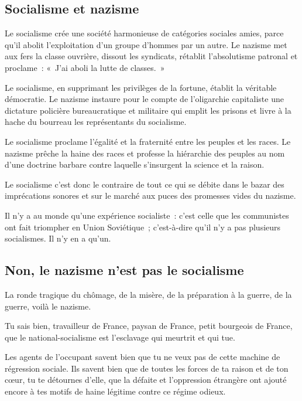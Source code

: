 \documentclass[french,twoside]{book} %
\begin{document}
\subsection[Socialisme et nazisme]{Socialisme et nazisme}
\noindent Le socialisme crée une société harmonieuse de catégories sociales amies, parce qu’il abolit l’exploitation d’un groupe d’hommes par un autre. Le nazisme met aux fers la classe ouvrière, dissout les syndicats, rétablit l’absolutisme patronal et proclame : « J’ai aboli la lutte de classes. »\par
Le socialisme, en supprimant les privilèges de la fortune, établit la véritable démocratie. Le nazisme instaure pour le compte de l’oligarchie capitaliste une dictature policière bureaucratique et militaire qui emplit les prisons et livre à la hache du bourreau les représentants du socialisme.\par
Le socialisme proclame l’égalité et la fraternité entre les peuples et les races. Le nazisme prêche la haine des races et professe la hiérarchie des peuples au nom d’une doctrine barbare contre laquelle s’insurgent la science et la raison.\par
Le socialisme c’est donc le contraire de tout ce qui se débite dans le bazar des imprécations sonores et sur le marché aux puces des promesses vides du nazisme.\par
Il n’y a au monde qu’une expérience socialiste : c’est celle que les communistes ont fait triompher en Union Soviétique ; c’est-à-dire qu’il n’y a pas plusieurs socialismes. Il n’y en a qu’un.
\subsection[Non, le nazisme n’est pas le socialisme]{Non, le nazisme n’est pas le socialisme}
\noindent La ronde tragique du chômage, de la misère, de la préparation à la guerre, de la guerre, voilà le nazisme.\par
Tu sais bien, travailleur de France, paysan de France, petit bourgeois de France, que le national-socialisme est l’esclavage qui meurtrit et qui tue.\par
Les agents de l’occupant savent bien que tu ne veux pas de cette machine de régression sociale. Ils savent bien que de toutes les forces de ta raison et de ton cœur, tu te détournes d’elle, que la défaite et l’oppression étrangère ont ajouté encore à tes motifs de haine légitime contre ce régime odieux.
\end{document}
